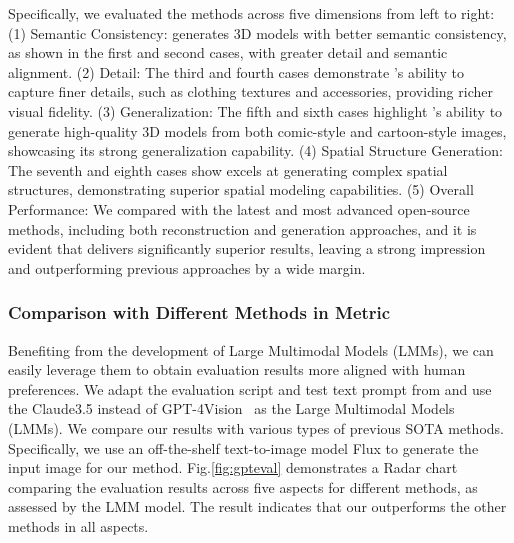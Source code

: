 Specifically, we evaluated the methods across five dimensions from left to right: (1) Semantic Consistency: \method{} generates 3D models with better semantic consistency, as shown in the first and second cases, with greater detail and semantic alignment. (2) Detail: The third and fourth cases demonstrate \method{}'s ability to capture finer details, such as clothing textures and accessories, providing richer visual fidelity. (3) Generalization: The fifth and sixth cases highlight \method{}'s ability to generate high-quality 3D models from both comic-style and cartoon-style images, showcasing its strong generalization capability. (4) Spatial Structure Generation: The seventh and eighth cases show \method{} excels at generating complex spatial structures, demonstrating superior spatial modeling capabilities. (5) Overall Performance: We compared \method{} with the latest and most advanced open-source methods, including both reconstruction and generation approaches, and it is evident that \method{} delivers significantly superior results, leaving a strong impression and outperforming previous approaches by a wide margin.

\subsubsection{Comparison with Different Methods in Metric}

Benefiting from the development of Large Multimodal Models (LMMs), we can easily leverage them to obtain evaluation results more aligned with human preferences. We adapt the evaluation script and test text prompt from \cite{DBLP:conf/cvpr/WuYLZLGLW24} and use the Claude3.5 instead of GPT-4Vision~\cite{DBLP:journals/corr/abs-2303-08774} as the Large Multimodal Models (LMMs).
We compare our results with various types of previous SOTA methods\cite{  
DBLP:conf/iclr/PooleJBM23, 
DBLP:conf/iclr/TangRZ0Z24, 
DBLP:conf/iccv/ChenCJJ23, 
li2023instant3d, 
DBLP:conf/cvpr/MetzerRPGC23, 
DBLP:conf/cvpr/Lin0TTZHKF0L23, 
DBLP:conf/iclr/ShiWYMLY24, 
DBLP:journals/corr/abs-2212-08751, 
DBLP:conf/nips/Wang00BL0023, 
DBLP:journals/corr/abs-2305-02463, 
DBLP:conf/cvpr/WangDLYS23, 
DBLP:conf/iclr/LiuLZLLKW24, 
long2024wonder3d}.
Specifically, we use an off-the-shelf text-to-image model Flux\cite{flux} to generate the input image for our method. 
Fig.\ref{fig:gpteval} demonstrates a Radar chart comparing the evaluation results across five aspects for different methods, as assessed by the LMM model.
The result indicates that our \method{} outperforms the other methods in all aspects.






